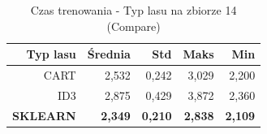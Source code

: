\begin{table}[htbp]
\centering
\small
\setlength{\tabcolsep}{6pt}
\renewcommand{\arraystretch}{1.2}
\caption{Czas trenowania - Typ lasu na zbiorze 14 (Compare)}
\label{tab:Compare_on_14_time}
\begin{tabular}{r|r|r|r|r}
\toprule
Typ lasu & Średnia & Std & Maks & Min \\
\hline
CART & 2,532 & 0,242 & 3,029 & 2,200 \\
ID3 & 2,875 & 0,429 & 3,872 & 2,360 \\
\textbf{SKLEARN} & \textbf{2,349} & \textbf{0,210} & \textbf{2,838} & \textbf{2,109} \\
\bottomrule
\end{tabular}
\end{table}